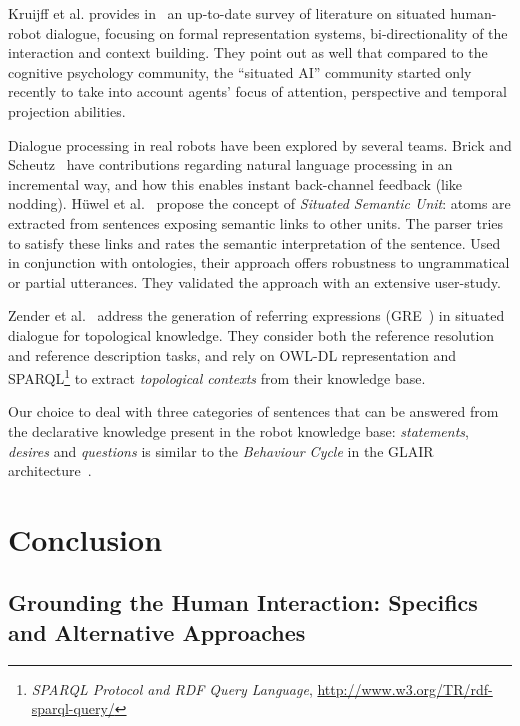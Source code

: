 \documentclass{svmult}
\begin{document}
Kruijff et al. provides in~\cite{Kruijff2010} an up-to-date survey of
literature on situated human-robot dialogue, focusing on formal representation
systems, bi-directionality of the interaction and context building. They point
out as well that compared to the cognitive psychology community, the ``situated
AI'' community started only recently to take into account agents' focus of
attention, perspective and temporal projection abilities.

Dialogue processing in real robots have been explored by several teams.  Brick
and Scheutz~\cite{Brick2007} have contributions regarding natural language
processing in an incremental way, and how this enables instant back-channel
feedback (like nodding). Hüwel et al.~\cite{Huwel2006} propose the concept of
\textit{Situated Semantic Unit}: atoms are extracted from sentences exposing
semantic links to other units. The parser tries to satisfy these links and
rates the semantic interpretation of the sentence. Used in conjunction with
ontologies, their approach offers robustness to ungrammatical or partial
utterances. They validated the approach with an extensive user-study.

Zender et al.~\cite{Zender2009} address the generation of referring expressions
(GRE~\cite{Dale1995}) in situated dialogue for topological knowledge.  They consider
both the reference resolution and reference description tasks, and rely on
OWL-DL representation and SPARQL\footnote{{\em SPARQL Protocol and RDF Query
Language}, \url{http://www.w3.org/TR/rdf-sparql-query/}} to extract
\emph{topological contexts} from their knowledge base.

Our choice to deal with three categories of sentences that can be answered from
the declarative knowledge present in the robot knowledge base:
\emph{statements}, \emph{desires} and \emph{questions} is similar to the
\emph{Behaviour Cycle} in the GLAIR architecture~\cite{Shapiro2009}.



\section{Conclusion}
\label{conclusion}

\subsection{Grounding the Human Interaction: Specifics and Alternative Approaches}
\label{sec|literature}
\end{document}
